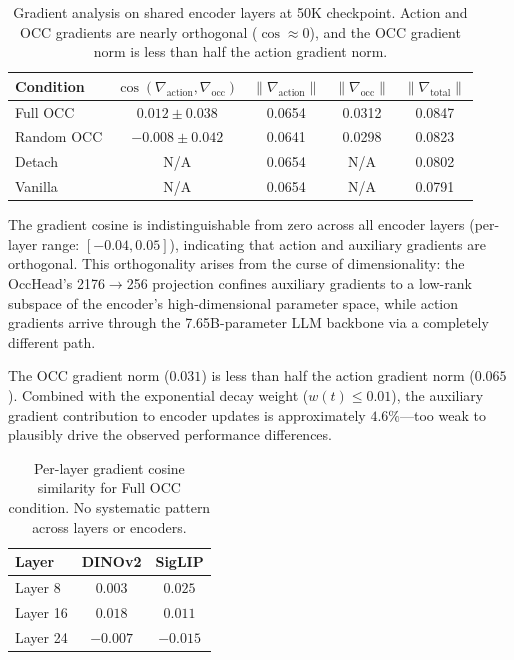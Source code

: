 \documentclass[10pt,letterpaper]{article}
\begin{document}
\begin{table}[h]
\centering
\caption{Gradient analysis on shared encoder layers at 50K checkpoint. Action and OCC gradients are nearly orthogonal ($\cos \approx 0$), and the OCC gradient norm is less than half the action gradient norm.}
\label{tab:grad}
\begin{tabular}{lcccc}
\toprule
\textbf{Condition} & $\cos(\nabla_\text{action}, \nabla_\text{occ})$ & $\|\nabla_\text{action}\|$ & $\|\nabla_\text{occ}\|$ & $\|\nabla_\text{total}\|$ \\
\midrule
Full OCC   & $0.012 \pm 0.038$ & 0.0654 & 0.0312 & 0.0847 \\
Random OCC & $-0.008 \pm 0.042$ & 0.0641 & 0.0298 & 0.0823 \\
Detach     & N/A               & 0.0654 & N/A    & 0.0802 \\
Vanilla    & N/A               & 0.0654 & N/A    & 0.0791 \\
\bottomrule
\end{tabular}
\end{table}

The gradient cosine is indistinguishable from zero across all encoder layers (per-layer range: $[-0.04, 0.05]$), indicating that action and auxiliary gradients are orthogonal. This orthogonality arises from the curse of dimensionality: the OccHead's 2176$\to$256 projection confines auxiliary gradients to a low-rank subspace of the encoder's high-dimensional parameter space, while action gradients arrive through the 7.65B-parameter LLM backbone via a completely different path.

The OCC gradient norm ($0.031$) is less than half the action gradient norm ($0.065$). Combined with the exponential decay weight ($w(t) \leq 0.01$), the auxiliary gradient contribution to encoder updates is approximately $4.6\%$---too weak to plausibly drive the observed performance differences.

\begin{table}[h]
\centering
\caption{Per-layer gradient cosine similarity for Full OCC condition. No systematic pattern across layers or encoders.}
\label{tab:grad_layer}
\begin{tabular}{lcc}
\toprule
\textbf{Layer} & \textbf{DINOv2} & \textbf{SigLIP} \\
\midrule
Layer 8  & $0.003$  & $0.025$  \\
Layer 16 & $0.018$  & $0.011$  \\
Layer 24 & $-0.007$ & $-0.015$ \\
\bottomrule
\end{tabular}
\end{table}
\end{document}
